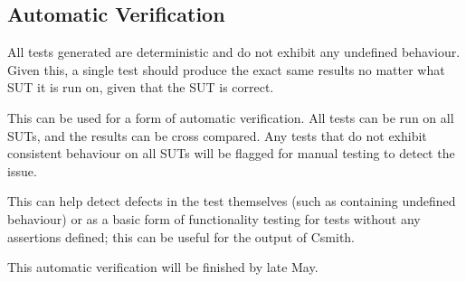 \subsection{Automatic Verification}

All tests generated are deterministic and do not exhibit any undefined behaviour. Given this, a single test should produce the exact same results no matter what SUT it is run on, given that the SUT is correct.

This can be used for a form of automatic verification. All tests can be run on all SUTs, and the results can be cross compared. Any tests that do not exhibit consistent behaviour on all SUTs will be flagged for manual testing to detect the issue.

This can help detect defects in the test themselves (such as containing undefined behaviour) or as a basic form of functionality testing for tests without any assertions defined; this can be useful for the output of Csmith.

This automatic verification will be finished by late May.